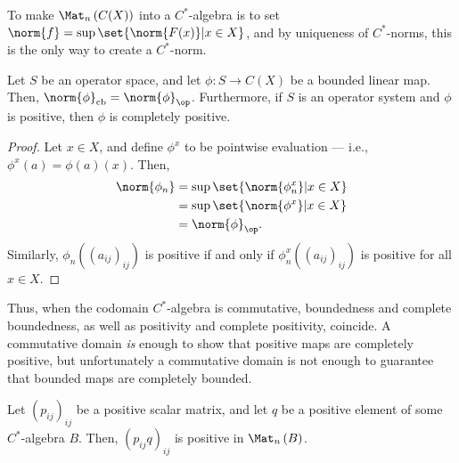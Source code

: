 \documentclass[10pt]{mypackage}
\DeclareMathOperator{\cb}{cb}
\begin{document}
To make $\Mat_n\left( C(X) \right)$ into a $C^{\ast}$-algebra is to set $\norm{f} = \sup\set{\norm{F(x)} | x\in X}$, and by uniqueness of $C^{\ast}$-norms, this is the only way to create a $C^{\ast}$-norm.
\begin{theorem}
  Let $S$ be an operator space, and let $\phi\colon S\rightarrow C(X)$ be a bounded linear map. Then, $\norm{\phi}_{\cb} = \norm{\phi}_{\op}$. Furthermore, if $S$ is an operator system and $\phi$ is positive, then $\phi$ is completely positive.
\end{theorem}
\begin{proof}
  Let $x\in X$, and define $\phi^{x}$ to be pointwise evaluation --- i.e., $\phi^x(a) = \phi(a)(x)$. Then,
  \begin{align*}
    \norm{\phi_n} &= \sup\set{\norm{\phi_n^x} | x\in X} \\
                  &= \sup\set{\norm{\phi^x} | x\in X} \\
                  &= \norm{\phi}_{\op}.
  \end{align*}
  Similarly, $\phi_n\left( \left( a_{ij} \right)_{ij} \right)$ is positive if and only if $\phi_n^x\left( \left( a_{ij} \right)_{ij} \right)$ is positive for all $x\in X$.
\end{proof}
Thus, when the codomain $C^{\ast}$-algebra is commutative, boundedness and complete boundedness, as well as positivity and complete positivity, coincide. A commutative domain \textit{is} enough to show that positive maps are completely positive, but unfortunately a commutative domain is not enough to guarantee that bounded maps are completely bounded.
\begin{lemma}
  Let $\left( p_{ij} \right)_{ij}$ be a positive scalar matrix, and let $q$ be a positive element of some $C^{\ast}$-algebra $B$. Then, $\left( p_{ij}q \right)_{ij}$ is positive in $\Mat_n\left( B \right)$.
\end{lemma}
\end{document}
